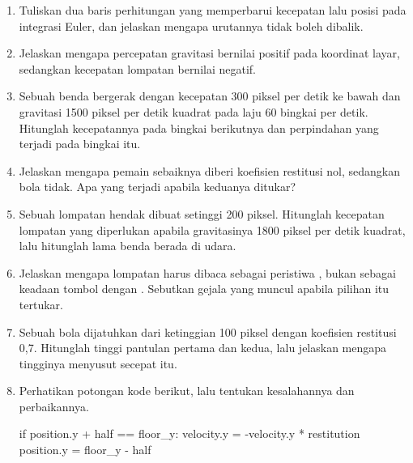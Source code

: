 
\begin{enumerate}
  \item Tuliskan dua baris perhitungan yang memperbarui kecepatan lalu posisi
        pada integrasi Euler, dan jelaskan mengapa urutannya tidak boleh
        dibalik.

  \item Jelaskan mengapa percepatan gravitasi bernilai positif pada koordinat
        layar, sedangkan kecepatan lompatan bernilai negatif.

  \item Sebuah benda bergerak dengan kecepatan 300 piksel per detik ke bawah
        dan gravitasi 1500 piksel per detik kuadrat pada laju 60 bingkai per
        detik. Hitunglah kecepatannya pada bingkai berikutnya dan perpindahan
        yang terjadi pada bingkai itu.

  \item Jelaskan mengapa pemain sebaiknya diberi koefisien restitusi nol,
        sedangkan bola tidak. Apa yang terjadi apabila keduanya ditukar?

  \item Sebuah lompatan hendak dibuat setinggi 200 piksel. Hitunglah kecepatan
        lompatan yang diperlukan apabila gravitasinya 1800 piksel per detik
        kuadrat, lalu hitunglah lama benda berada di udara.

  \item Jelaskan mengapa lompatan harus dibaca sebagai peristiwa
        , bukan sebagai keadaan tombol dengan
        . Sebutkan gejala yang muncul apabila pilihan
        itu tertukar.

  \item Sebuah bola dijatuhkan dari ketinggian 100 piksel dengan koefisien
        restitusi 0,7. Hitunglah tinggi pantulan pertama dan kedua, lalu
        jelaskan mengapa tingginya menyusut secepat itu.

  \item Perhatikan potongan kode berikut, lalu tentukan kesalahannya dan
        perbaikannya.
\begin{kodekeluaran}
if position.y + half == floor_y:
    velocity.y = -velocity.y * restitution
    position.y = floor_y - half
\end{kodekeluaran}
\end{enumerate}

